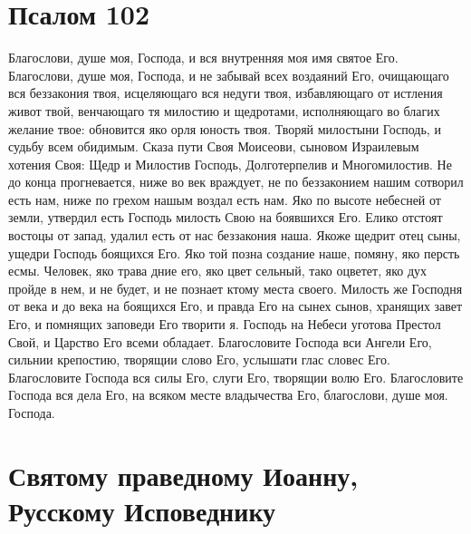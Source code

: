 \section{Псалом 102}\begin{mymulticols}



Благослови, душе моя, Господа, и вся внутренняя моя имя святое Его. Благослови, душе моя, Господа, и не забывай всех воздаяний Его, очищающаго вся беззакония твоя, исцеляющаго вся недуги твоя, избавляющаго от истления живот твой, венчающаго тя милостию и щедротами, исполняющаго во благих желание твое: обновится яко орля юность твоя. Творяй милостыни Господь, и судьбу всем обидимым. Сказа пути Своя Моисеови, сыновом Израилевым хотения Своя: Щедр и Милостив Господь, Долготерпелив и Многомилостив. Не до конца прогневается, ниже во век враждует, не по беззаконием нашим сотворил есть нам, ниже по грехом нашым воздал есть нам. Яко по высоте небесней от земли, утвердил есть Господь милость Свою на боявшихся Его. Елико отстоят востоцы от запад, удалил есть от нас беззакония наша. Якоже щедрит отец сыны, ущедри Господь боящихся Его. Яко той позна создание наше, помяну, яко персть есмы. Человек, яко трава дние его, яко цвет сельный, тако оцветет, яко дух пройде в нем, и не будет, и не познает ктому места своего. Милость же Господня от века и до века на боящихся Его, и правда Его на сынех сынов, хранящих завет Его, и помнящих заповеди Его творити я. Господь на Небеси уготова Престол Свой, и Царство Его всеми обладает. Благословите Господа вси Ангели Его, сильнии крепостию, творящии слово Его, услышати глас словес Его. Благословите Господа вся силы Его, слуги Его, творящии волю Его. Благословите Господа вся дела Его, на всяком месте владычества Его, благослови, душе моя. Господа.


\end{mymulticols}

\section{Святому праведному Иоанну, Русскому Исповеднику}

\tolkopoblagosloveniyu


